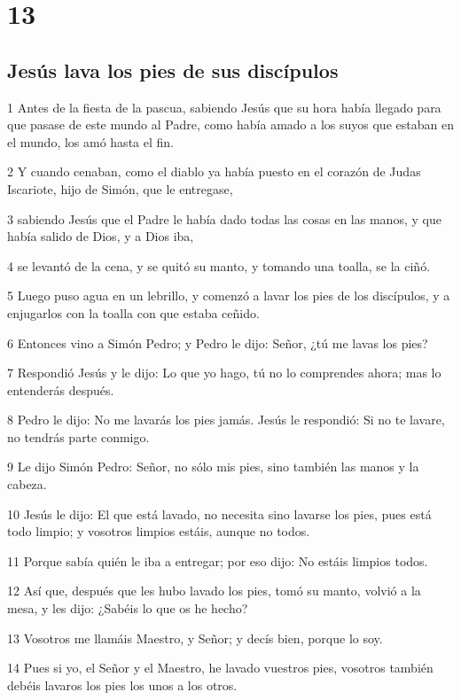 \chapter{13}

\section*{Jesús lava los pies de sus discípulos}

\par 1 Antes de la fiesta de la pascua, sabiendo Jesús que su hora había llegado para que pasase de este mundo al Padre, como había amado a los suyos que estaban en el mundo, los amó hasta el fin.
\par 2 Y cuando cenaban, como el diablo ya había puesto en el corazón de Judas Iscariote, hijo de Simón, que le entregase,
\par 3 sabiendo Jesús que el Padre le había dado todas las cosas en las manos, y que había salido de Dios, y a Dios iba,
\par 4 se levantó de la cena, y se quitó su manto, y tomando una toalla, se la ciñó.
\par 5 Luego puso agua en un lebrillo, y comenzó a lavar los pies de los discípulos, y a enjugarlos con la toalla con que estaba ceñido.
\par 6 Entonces vino a Simón Pedro; y Pedro le dijo: Señor, ¿tú me lavas los pies?
\par 7 Respondió Jesús y le dijo: Lo que yo hago, tú no lo comprendes ahora; mas lo entenderás después.
\par 8 Pedro le dijo: No me lavarás los pies jamás. Jesús le respondió: Si no te lavare, no tendrás parte conmigo.
\par 9 Le dijo Simón Pedro: Señor, no sólo mis pies, sino también las manos y la cabeza.
\par 10 Jesús le dijo: El que está lavado, no necesita sino lavarse los pies, pues está todo limpio; y vosotros limpios estáis, aunque no todos.
\par 11 Porque sabía quién le iba a entregar; por eso dijo: No estáis limpios todos.
\par 12 Así que, después que les hubo lavado los pies, tomó su manto, volvió a la mesa, y les dijo: ¿Sabéis lo que os he hecho?
\par 13 Vosotros me llamáis Maestro, y Señor; y decís bien, porque lo soy.
\par 14 Pues si yo, el Señor y el Maestro, he lavado vuestros pies, vosotros también debéis lavaros los pies los unos a los otros.
